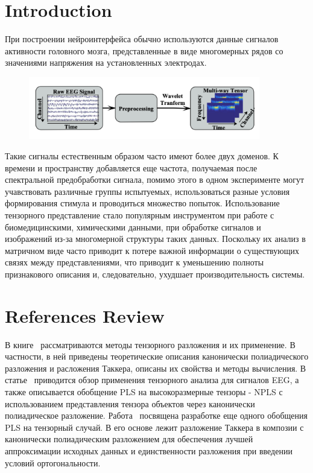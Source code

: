 \section{Introduction}
При построении нейроинтерфейса обычно используются данные сигналов активности головного мозга, представленные в виде многомерных рядов со значениями напряжения на установленных электродах. 

\begin{figure}[h]
	\centering
	\includegraphics[width=0.9\textwidth]{chapters/varenik2/images/multi-way-eeg.png}
\end{figure}

Такие сигналы естественным образом часто имеют более двух доменов. К времени и пространству добавляется еще частота, получаемая после спектральной предобработки сигнала, помимо этого в одном эксперименте могут учавствовать различные группы испытуемых, использоваться разные условия формирования стимула  и проводиться множество попыток. Использование тензорного представление стало популярным инструментом при работе с биомедицинскими, химическими данными, при обработке сигналов и изображений из-за многомерной структуры таких данных. Поскольку их анализ в матричном виде часто приводит к потере важной информации о существующих связях между представлениями, что приводит к уменьшению полноты признакового описания и, следовательно, ухудшает производительность системы.

\section{References Review}
В книге~\cite{Kolda2009TensorDA} рассматриваются методы тензорного разложения и их применение. В частности, в ней приведены теоретические описания канонически полиадического разложения и расложения Таккера, описаны их свойства и методы вычисления. В статье~\cite{CONG201559} приводится обзор применения тензорного анализа для сигналов EEG, а также описывается обобщение PLS на высокоразмерные тензоры - NPLS с использованием  представления тензора объектов через канонически полиадическое разложение. 
Работа~\cite{6365194} посвящена разработке еще одного обобщения PLS на тензорный случай. В его основе лежит разложение Таккера в композии с канонически полиадическим разложением для обеспечения лучшей аппроксимации исходных данных и единственности разложения при введении условий ортогональности. 

